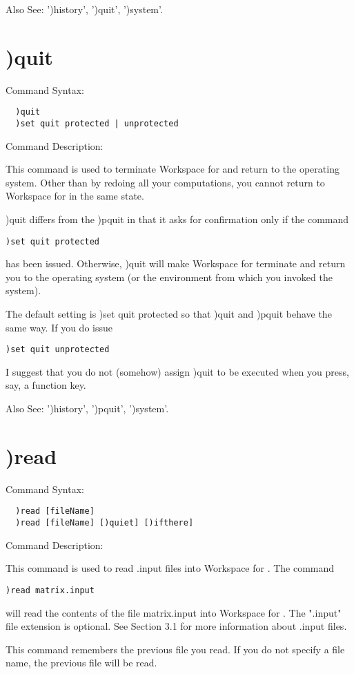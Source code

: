 Also See: ')history', ')quit', ')system'.

\section{)quit}

Command Syntax:
\begin{verbatim}
  )quit
  )set quit protected | unprotected
\end{verbatim}
Command Description:

This command is used to terminate Workspace for \nr{} and return to the operating system. Other than by redoing all your computations, you cannot return to Workspace for \nr{} in the same state.

)quit differs from the )pquit in that it asks for confirmation only if the command
\begin{verbatim}
)set quit protected
\end{verbatim}
has been issued. Otherwise, )quit will make Workspace for \nr{} terminate and return you to the operating system (or the environment from which you invoked the system).

The default setting is )set quit protected so that )quit and )pquit behave the same way. If you do issue
\begin{verbatim}
)set quit unprotected
\end{verbatim}
I suggest that you do not (somehow) assign )quit to be executed when you press, say, a function key.

Also See: ')history', ')pquit', ')system'.

\section{)read}

Command Syntax:
\begin{verbatim}
  )read [fileName]
  )read [fileName] [)quiet] [)ifthere]
\end{verbatim}
Command Description:

This command is used to read .input files into Workspace for \nr{}. The command
\begin{verbatim}
)read matrix.input
\end{verbatim}
will read the contents of the file matrix.input into Workspace for \nr{}. The ".input" file extension is optional. See Section 3.1 for more information about .input files.

This command remembers the previous file you read. If you do not specify a file name, the previous file will be read.

